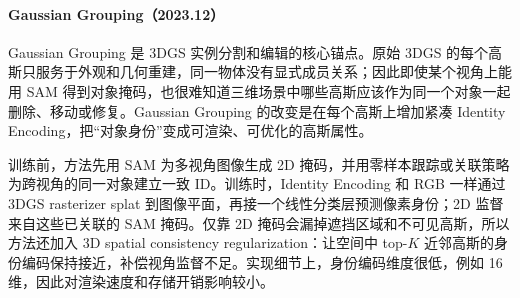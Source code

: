 \paragraph{Gaussian Grouping（2023.12）\cite{2312_00732}}
Gaussian Grouping 是 3DGS 实例分割和编辑的核心锚点。原始 3DGS 的每个高斯只服务于外观和几何重建，同一物体没有显式成员关系；因此即使某个视角上能用 SAM 得到对象掩码，也很难知道三维场景中哪些高斯应该作为同一个对象一起删除、移动或修复。Gaussian Grouping 的改变是在每个高斯上增加紧凑 Identity Encoding，把“对象身份”变成可渲染、可优化的高斯属性。

训练前，方法先用 SAM 为多视角图像生成 2D 掩码，并用零样本跟踪或关联策略为跨视角的同一对象建立一致 ID。训练时，Identity Encoding 和 RGB 一样通过 3DGS rasterizer splat 到图像平面，再接一个线性分类层预测像素身份；2D 监督来自这些已关联的 SAM 掩码。仅靠 2D 掩码会漏掉遮挡区域和不可见高斯，所以方法还加入 3D spatial consistency regularization：让空间中 top-$K$ 近邻高斯的身份编码保持接近，补偿视角监督不足。实现细节上，身份编码维度很低，例如 16 维，因此对渲染速度和存储开销影响较小。

